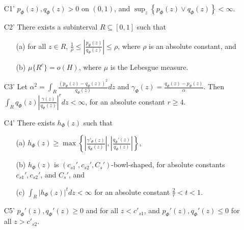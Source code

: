 \documentclass{article}
\begin{document}
\begin{proposition}
\begin{enumerate}
\item[C1'] $p_{\Phi}(z), q_{\Phi}(z) > 0$ on $(0, 1)$, and $\sup_z \left\{p_{\Phi}(z) \vee q_{\Phi}(z)\right\} < \infty$. 
\item[C2'] There exists a subinterval $R \subseteq [0,1]$ such that
\begin{itemize}
\item[(a)] for all $z \in R$, $\frac{1}{\rho} \leq \left| \frac{p_{\Phi}(z)}{q_{\Phi}(z)} \right| \leq \rho$, where $\rho$ is an absolute constant, and
\item[(b)] $\mu\{R^c\} = o(H)$, where $\mu$ is the Lebesgue measure.
\end{itemize}
\item[C3'] Let $\alpha^2 = \int_R \frac{(p_{\Phi}(z) - q_{\Phi}(z))^2}{q_{\Phi}(z)} dz$ and $\gamma_{\Phi} (z) = \frac{q_{\Phi}(z) - p_{\Phi}(z)}{\alpha}$. Then $\int_R q_{\Phi}(z) \left| \frac{\gamma(z)}{q_{\Phi}(z)} \right|^r dz  < \infty$, for an absolute constant $r \geq 4$.
\item[C4'] There exists $h_{\Phi}(z)$ such that
\begin{itemize}
\item[(a)] $h_{\Phi}(z) \geq \max \left\{  \left|\frac{\gamma'_{\Phi}(z)}{q_{\Phi}(z)} \right|, 
 \left|\frac{q_{\Phi}'(z)}{q_{\Phi}(z)}\right|  \right\} $,
 \item[(b)] $h_{\Phi}(z)$ is $(c_{s1}', c_{s2}', C_s')$-bowl-shaped, for absolute constants $c_{s1}', c_{s2}'$, and $C_s'$, and
\item[(c)] $\int_R |h_{\Phi}(z)|^t dz < \infty$ for an absolute constant $\frac{2}{r} < t < 1$.
\end{itemize}
\item[C5'] $p_{\Phi}'(z), q_{\Phi}'(z) \geq 0$ and for all $z < c'_{s1}$, and $p_{\Phi}'(z), q_{\Phi}'(z) \leq 0$ for all $z > c'_{s2}$.
\end{enumerate}
\end{proposition}
\end{document}
